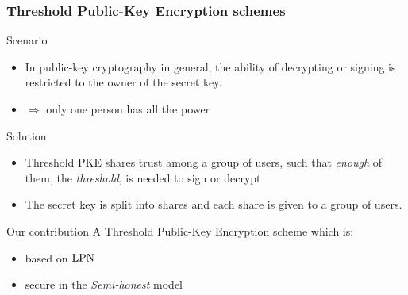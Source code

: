 \begin{frame}
\frametitle{Threshold Public-Key Encryption schemes}
\begin{block}{Scenario}
  \begin{itemize}
   \item In public-key cryptography in general, the ability of decrypting or signing is restricted to the owner of the secret key.
   \item $\Rightarrow$ \alert{only one person has all the power} 
  \end{itemize}  
 \end{block}
 
 \begin{block}{Solution}
 \begin{itemize}
  \item Threshold PKE shares trust among a group of users, such that \emph{enough} of them, the \emph{threshold}, is needed to sign or decrypt
  \item The secret key is split into shares and each share is given to a group of users.
 \end{itemize}  
 \end{block}
 
 \begin{block}{Our contribution}
 A Threshold Public-Key Encryption scheme which is:
 \begin{itemize}
   \item based on $\mathrm{LPN}$
   \item secure in the \emph{Semi-honest} model
  \end{itemize}

 \end{block}



\end{frame}


